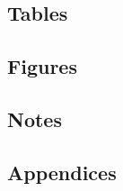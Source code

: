 \documentclass[
]{scrartcl}
\begin{document}
\newpage{}

\subsection{Tables}\label{tables}

\newpage{}

\subsection{Figures}\label{figures}

\newpage{}

\subsection{Notes}\label{notes}

\newpage{}

\subsection{Appendices}\label{sec-appendix}
\end{document}
